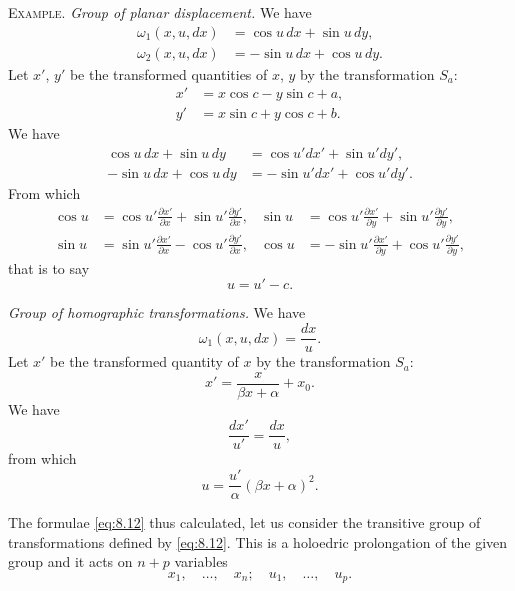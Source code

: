 \documentclass[leqno,11pt]{book}
\numberwithin{equation}{chapter}
\newcommand{\pd}{\partial}
\theoremstyle{shape1}
\theoremstyle{shapesmall}
\newcommand{\somespace}{\vspace{9pt}}
\begin{document}
{\small
\textsc{Example.} \emph{Group of planar displacement.} We have
\begin{align*}
  \omega_{1}(x,u,dx)&=\cos u\,dx+\sin u\,dy,\\
  \omega_{2}(x,u,dx)&=-\sin u\,dx+\cos u\,dy.
\end{align*}
Let $x'$, $y'$ be the transformed quantities of $x$, $y$ by the transformation $S_{a}$:
\begin{align*}
  x'&=x\cos c-y\sin c+a,\\
  y'&=x\sin c+y\cos c+ b.
\end{align*}
We have
\begin{align*}
  \cos u\,dx+\sin u\,dy&=\cos u'dx'+\sin u'dy',\\
  -\sin u\,dx+\cos u\,dy&=-\sin u'dx'+\cos u'dy'.
\end{align*}
From which
\begin{align*}
  \cos u&=\cos u'\frac{\pd x'}{\pd x}+\sin u'\frac{\pd y'}{\pd x},&\sin u&=\cos u'\frac{\pd x'}{\pd y}+\sin u'\frac{\pd y'}{\pd y},\\
  \sin u&=\sin u'\frac{\pd x'}{\pd x}-\cos u'\frac{\pd y'}{\pd x},&\cos u&=-\sin u'\frac{\pd x'}{\pd y}+\cos u'\frac{\pd y'}{\pd y},
\end{align*}
that is to say
\[
u=u'-c.
\]

\somespace

\emph{Group of homographic transformations.} We have
\[
\omega_{1}(x,u,dx)=\frac{dx}{u}.
\]
Let $x'$ be the transformed quantity of $x$ by the transformation $S_{a}$:
\[
x'=\frac{x}{\beta x+\alpha}+x_{0}.
\]
We have
\[
\frac{dx'}{u'}=\frac{dx}{u},
\]
from which
\[
u=\frac{u'}{\alpha}(\beta x+\alpha)^{2}.
\]
\somespace
}

The formulae \eqref{eq:8.12} thus calculated, let us consider the transitive group of transformations defined by \eqref{eq:8.12}. This is a holoedric prolongation of the given group and it acts on $n+p$ variables
\[
x_{1},\quad \dots,\quad x_{n};\quad u_{1},\quad \dots,\quad u_{p}.
\]
\end{document}
